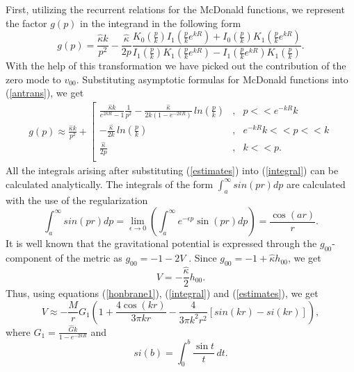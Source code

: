 \documentclass[a4paper,12pt]{article}
\begin{document}
First, utilizing the recurrent relations for the McDonald functions, we
represent the  factor $g(p)$ in the integrand in the following form
\begin{equation}\label{antrans}
g(p) =\frac{\hat\kappa
k}{p^2}-\frac{\hat\kappa}{2p}\frac{K_0\left(\frac{p}{k}\right)
I_1\left(\frac{p}{k}e^{kR}\right)+I_0\left(\frac{p}{k}\right)
K_1\left(\frac{p}{k}e^{kR}\right)}{I_1\left(\frac{p}{k}\right)
K_1\left(\frac{p}{k}e^{kR}\right)-I_1\left(\frac{p}{k}e^{kR}\right)
K_1\left(\frac{p}{k}\right)}.
\end{equation}
With the help of this transformation we have picked out the contribution
of the zero mode to $v_{00}$. Substituting asymptotic formulas for McDonald
functions into (\ref{antrans}), we get
\begin{eqnarray}\label{estimates}
g(p)\approx\frac{\hat\kappa k}{p^2}+{\left[
 \begin{array}{lcl}
\frac{\hat\kappa k}{e^{2kR}-1}\frac{1}{p^2}-
\frac{\hat\kappa}{2k\left(1-e^{-2kR}\right)}\,
ln\left(\frac{p}{k}\right)&, &p<<e^{-kR}k \\
-\frac{\hat\kappa}{2k}\, ln\left(\frac{p}{k}\right)&,
&e^{-kR}k<<p<<k \\ \frac{\hat\kappa}{2p}&,  &k<<p. \\
\end{array}
\right.}
\end{eqnarray}
All the integrals arising after substituting (\ref{estimates}) into
(\ref{integral}) can be calculated analytically. The integrals of the
form $\int_a^\infty sin(pr) dp$ are calculated with the use of the
regularization
\begin{equation}
\int_a^\infty sin(pr) dp=\lim_{\epsilon\to 0
}\left(\int_{a}^{\infty} e^{-\epsilon p}\sin(pr) dp
\right)=\frac{\cos(ar)}{r}.
\end{equation}
It is well known that the gravitational potential is expressed
through the $g_{00}$-component of the  metric as
$g_{00}=-1-2V$ \cite{Weinberg}. Since $g_{00}=-1+\hat\kappa
h_{00}$, we get
\begin{equation}
V=-\frac{\hat\kappa}{2}h_{00}.
\end{equation}
Thus, using equations
(\ref{honbrane1}), (\ref{integral}) and (\ref{estimates}), we get
\begin{equation}\label{NL1}
V\approx -\frac{M}{r}G_1\left(1+\frac{4\cos(kr)}{3\pi
kr}-\frac{4}{3\pi k^2 r^2}\left[sin(kr)-si(kr)\right]\right),
\end{equation}
where $G_1=\frac{\hat G k}{1-e^{-2kR}}$ and $$si(b)=\int_0^b
\frac{\sin{t}}{t}\, dt.$$
\end{document}
